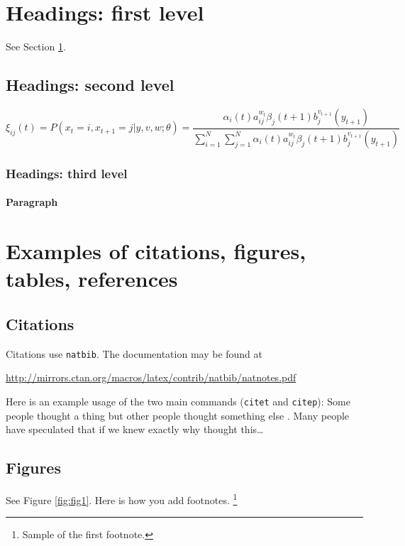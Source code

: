 \documentclass{article}
\begin{document}
\section{Headings: first level}
\label{sec:headings}

\lipsum[4] See Section \ref{sec:headings}.

\subsection{Headings: second level}
\lipsum[5]
\begin{equation}
	\xi _{ij}(t)=P(x_{t}=i,x_{t+1}=j|y,v,w;\theta)= {\frac {\alpha _{i}(t)a^{w_t}_{ij}\beta _{j}(t+1)b^{v_{t+1}}_{j}(y_{t+1})}{\sum _{i=1}^{N} \sum _{j=1}^{N} \alpha _{i}(t)a^{w_t}_{ij}\beta _{j}(t+1)b^{v_{t+1}}_{j}(y_{t+1})}}
\end{equation}

\subsubsection{Headings: third level}
\lipsum[6]

\paragraph{Paragraph}
\lipsum[7]



\section{Examples of citations, figures, tables, references}
\label{sec:others}

\subsection{Citations}
Citations use \verb+natbib+. The documentation may be found at
\begin{center}
	\url{http://mirrors.ctan.org/macros/latex/contrib/natbib/natnotes.pdf}
\end{center}

Here is an example usage of the two main commands (\verb+citet+ and \verb+citep+): Some people thought a thing \citep{kour2014real, keshet2016prediction} but other people thought something else \citep{kour2014fast}. Many people have speculated that if we knew exactly why \citet{kour2014fast} thought this\dots

\subsection{Figures}
\lipsum[10]
See Figure \ref{fig:fig1}. Here is how you add footnotes. \footnote{Sample of the first footnote.}
\lipsum[11]
\end{document}
